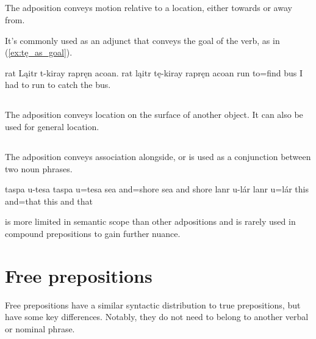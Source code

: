 \subsection{}
The adposition  conveys motion relative to a location, either towards or away from.

It's commonly used as an adjunct that conveys the goal of the verb, as in (\ref{ex:tę_as_goal}).

\begin{example}
    \label{ex:tę_as_goal}
    \script rat Ląitr t-kiray rapręn acoan.
    \bits rat ląitr tę-kiray {rapręn acoan}
     run to=find {bus}
    \tr I had to run to catch the bus.
\end{example}

\subsection{}
The adposition  conveys location on the surface of another object. It can also be used for general location.

\subsection{}
The adposition  conveys association alongside, or is used as a conjunction between two noun phrases.

\begin{subexamples}
    \ex
        \script taspa u-tesa
        \bits taspa u=tesa
        \gloss sea and=shore
        \tr sea and shore
    \ex
        \script lanr u-lár
        \bits lanr u=lár
        \gloss this and=that
        \tr this and that
\end{subexamples}

 is more limited in semantic scope than other adpositions and is rarely used in compound prepositions to gain further nuance.

\section{Free prepositions} \label{sec:free_preps}
Free prepositions have a similar syntactic distribution to true prepositions, but have some key differences. Notably, they do not need to belong to another verbal or nominal phrase. 

